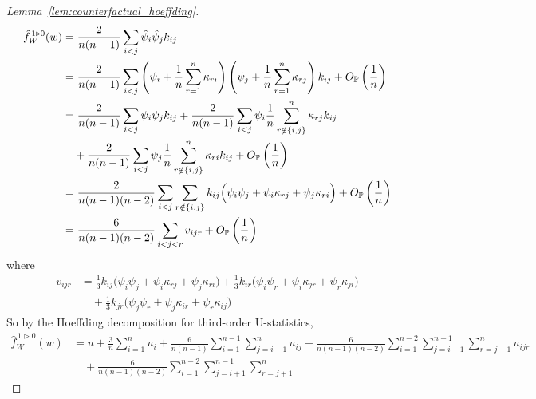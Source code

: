 \begin{proof}[Lemma~\ref{lem:counterfactual_hoeffding}]

  \begin{align*}
    \hat f_W^{\,1 \triangleright 0}(w)
    &=
    \frac{2}{n(n-1)}
    \sum_{i < j}
    \hat \psi_i
    \hat \psi_j
    k_{i j} \\
    &=
    \frac{2}{n(n-1)}
    \sum_{i < j}
    \left(
      \psi_i
      + \frac{1}{n}
      \sum_{r=1}^n \kappa_{r i}
    \right)
    \left(
      \psi_j
      + \frac{1}{n}
      \sum_{r=1}^n \kappa_{r j}
    \right)
    k_{i j}
    + O_\P\left(\frac{1}{n}\right) \\
    &=
    \frac{2}{n(n-1)}
    \sum_{i < j}
    \psi_i
    \psi_j
    k_{i j}
    + \frac{2}{n(n-1)}
    \sum_{i < j}
    \psi_i
    \frac{1}{n}
    \sum_{r \notin \{i,j\}}^n \kappa_{r j}
    k_{i j} \\
    &\quad+
    \frac{2}{n(n-1)}
    \sum_{i < j}
    \psi_j
    \frac{1}{n}
    \sum_{r \notin \{i,j\}}^n \kappa_{r i}
    k_{i j}
    + O_\P\left(\frac{1}{n}\right) \\
    &=
    \frac{2}{n(n-1)(n-2)}
    \sum_{i < j}
    \sum_{r \notin \{i,j\}}
    k_{i j}
    \Big(
      \psi_i
      \psi_j
      +\psi_i
      \kappa_{r j}
      +\psi_j
      \kappa_{r i}
    \Big)
    + O_\P\left(\frac{1}{n}\right) \\
    &=
    \frac{6}{n(n-1)(n-2)}
    \sum_{i < j < r}
    v_{i j r}
    + O_\P\left(\frac{1}{n}\right)
  \end{align*}
  where
  \begin{align*}
    v_{i j r}
    &=
    \frac{1}{3}
    k_{i j} \Big(\psi_i \psi_j +\psi_i \kappa_{r j} +\psi_j \kappa_{r i} \Big)
    + \frac{1}{3}
    k_{i r} \Big(\psi_i \psi_r +\psi_i \kappa_{jr} +\psi_r \kappa_{j i} \Big) \\
    &\quad+
    \frac{1}{3}
    k_{jr} \Big(\psi_j \psi_r +\psi_j \kappa_{i r} +\psi_r \kappa_{i j} \Big)
  \end{align*}
  So by the Hoeffding decomposition for third-order U-statistics,
  \begin{align*}
    \hat f_W^{\,1 \triangleright 0}(w)
    &=
    u
    + \frac{3}{n}
    \sum_{i=1}^n
    u_i
    + \frac{6}{n(n-1)}
    \sum_{i=1}^{n-1}
    \sum_{j=i+1}^n
    u_{i j}
    + \frac{6}{n(n-1)(n-2)}
    \sum_{i=1}^{n-2}
    \sum_{j=i+1}^{n-1}
    \sum_{r=j+1}^n
    u_{i j r} \\
    &\quad+
    \frac{6}{n(n-1)(n-2)}
    \sum_{i=1}^{n-2}
    \sum_{j=i+1}^{n-1}
    \sum_{r=j+1}^n

\end{align*}
\end{proof}
